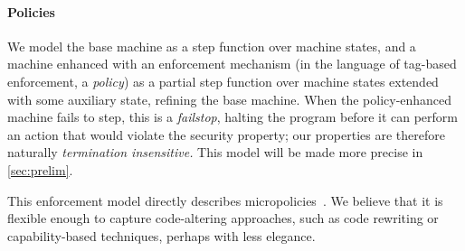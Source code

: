 \documentclass[acmsmall,review,anonymous]{acmart}\settopmatter{printfolios=true,printccs=false,printacmref=false}
\begin{document}
\paragraph*{Policies}

We model the base machine as a step function over machine states, and a machine enhanced with
an enforcement mechanism (in the language of tag-based enforcement, a {\em policy}) as
a partial step function over machine states extended with some auxiliary state, refining
the base machine. When the policy-enhanced machine fails to step, this is a {\em failstop},
halting the program before it can perform an action that would violate the security property;
our properties are therefore naturally \emph{termination insensitive.}
This model will be made more precise in \cref{sec:prelim}.



This enforcement model directly describes micropolicies~\citep{pump_oakland2015}.
We believe that it is flexible enough to capture code-altering approaches, such as code
rewriting or capability-based techniques, perhaps with less elegance.

\newcommand{\TAGS}{\mathcal{T}}
\newcommand{\tagname}{t}
\newcommand{\uP}{{\mu P}}
\end{document}
